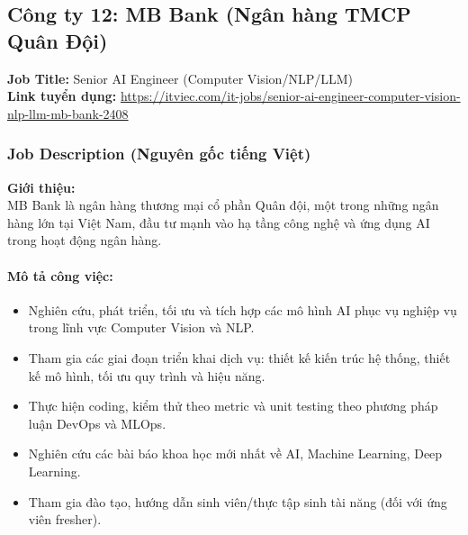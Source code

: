 \subsection{Công ty 12: MB Bank (Ngân hàng TMCP Quân Đội)}

\noindent\textbf{Job Title:} Senior AI Engineer (Computer Vision/NLP/LLM) \\
\textbf{Link tuyển dụng:} \url{https://itviec.com/it-jobs/senior-ai-engineer-computer-vision-nlp-llm-mb-bank-2408}

\subsubsection*{Job Description (Nguyên gốc tiếng Việt)}

\textbf{Giới thiệu:} \\
\indent MB Bank là ngân hàng thương mại cổ phần Quân đội, một trong những ngân hàng lớn tại Việt Nam, đầu tư mạnh vào hạ tầng công nghệ và ứng dụng AI trong hoạt động ngân hàng.

\paragraph{Mô tả công việc:}
\begin{itemize}
    \item Nghiên cứu, phát triển, tối ưu và tích hợp các mô hình AI phục vụ nghiệp vụ trong lĩnh vực Computer Vision và NLP.
    \item Tham gia các giai đoạn triển khai dịch vụ: thiết kế kiến trúc hệ thống, thiết kế mô hình, tối ưu quy trình và hiệu năng.
    \item Thực hiện coding, kiểm thử theo metric và unit testing theo phương pháp luận DevOps và MLOps.
    \item Nghiên cứu các bài báo khoa học mới nhất về AI, Machine Learning, Deep Learning.
    \item Tham gia đào tạo, hướng dẫn sinh viên/thực tập sinh tài năng (đối với ứng viên fresher).
\end{itemize}

